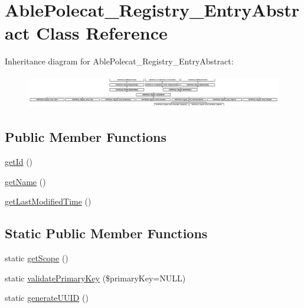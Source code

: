 \hypertarget{class_able_polecat___registry___entry_abstract}{}\section{Able\+Polecat\+\_\+\+Registry\+\_\+\+Entry\+Abstract Class Reference}
\label{class_able_polecat___registry___entry_abstract}
Inheritance diagram for Able\+Polecat\+\_\+\+Registry\+\_\+\+Entry\+Abstract\+:\begin{figure}[H]
\begin{center}
\leavevmode
\includegraphics[height=1.463415cm]{class_able_polecat___registry___entry_abstract}
\end{center}
\end{figure}
\subsection*{Public Member Functions}
\begin{DoxyCompactItemize}
\item 
\hyperlink{class_able_polecat___registry___entry_abstract_a12251d0c022e9e21c137a105ff683f13}{get\+Id} ()
\item 
\hyperlink{class_able_polecat___registry___entry_abstract_a3d0963e68bb313b163a73f2803c64600}{get\+Name} ()
\item 
\hyperlink{class_able_polecat___registry___entry_abstract_ada825a3515aa1569a1a2893c47a643b9}{get\+Last\+Modified\+Time} ()
\end{DoxyCompactItemize}
\subsection*{Static Public Member Functions}
\begin{DoxyCompactItemize}
\item 
static \hyperlink{class_able_polecat___registry___entry_abstract_ad9ade868bd136d32967059d1cccb3e92}{get\+Scope} ()
\item 
static \hyperlink{class_able_polecat___registry___entry_abstract_aedcd0eb79d1e9572c8ed52ccaf31c3c8}{validate\+Primary\+Key} (\$primary\+Key=N\+U\+L\+L)
\item 
static \hyperlink{class_able_polecat___registry___entry_abstract_a4a9230cc2bec2f2ab12d0ed53bb18865}{generate\+U\+U\+I\+D} ()
\end{DoxyCompactItemize}
